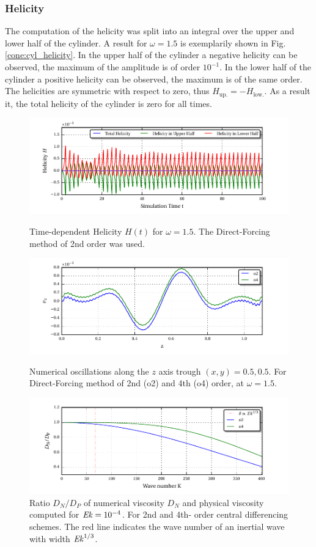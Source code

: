 \subsubsection{Helicity}

The computation of the helicity was split into an integral over the upper and lower half
of the cylinder.  A result for $\omega=1.5$ is exemplarily shown in Fig. \ref{cone:cyl_helicity}.
In the upper half of the cylinder a negative helicity can be observed, the maximum of the amplitude is of order $10^{-1}$.
In the lower half of the cylinder a positive helicity can be observed, the maximum is of the same order.
The helicities are symmetric with respect to zero, thus $H_{\text{up.}} = -H_{\text{low.}}$.
As a result it, the total helicity of the cylinder is zero for all times.

\begin{figure}[!p]
  \centering
  \includegraphics{gfx/cone/cylinder/helicity.pdf}  \caption{
      Time-dependent Helicity $H(t)$ for $\omega=1.5$. The Direct-Forcing method of 2nd order was used.
      \label{cone:cyl_helicity}
      }
  \centering
  \includegraphics{gfx/cone/cylinder/oscillations.pdf}  \caption{
      Numerical oscillations along the $z$ axis trough $(x,y) = 0.5, 0.5$.
      For Direct-Forcing method of 2nd (o2) and 4th (o4) order, at $\omega=1.5$.
      \label{cone:cyl_oscillations}
      }
  \centering
  \includegraphics{gfx/cone/cylinder/numvis.pdf}  \caption{
      Ratio $D_N/D_P$ of  numerical viscosity  $D_N$ and physical viscosity computed for $\mbox{\textit{Ek}}=10^{-4}$. For 2nd and 4th- order central differencing schemes.
      The red line indicates the wave number of an inertial wave with width $\mbox{\textit{Ek}}^{1/3}$.
      \label{cone:cyl_numvis}
      }
\end{figure}

